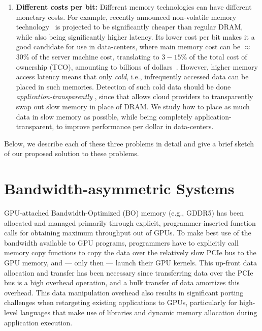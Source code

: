 \begin{enumerate}
\item
\textbf{Different costs per bit:}
Different memory technologies can have different monetary costs.  For example,
recently announced non-volatile memory technology~\cite{xpoint} is projected to
be significantly cheaper than regular DRAM, while also being significantly
higher latency. Its lower cost per bit makes it a good candidate for use in
data-centers, where main memory cost can be $\approx$ 30\% of the server machine
cost, translating to $3-15\%$ of the total cost of ownership (TCO), amounting to
billions of dollars~\cite{borosso2013}. However, higher memory access latency means that only
{\it cold}, i.e., infrequently accessed data can be placed in such memories.
Detection of such cold data should be done {\it
application-transparently} , since
that allows cloud providers to transparently swap out slow memory in place of
DRAM.
We study how to place as much data in slow memory as possible, while being
completely application-transparent, to improve
performance per dollar in data-centers.  \end{enumerate}

Below, we describe each of these three problems in detail and give a brief
sketch of our proposed solution to these problems.

\section{Bandwidth-asymmetric Systems}
GPU-attached Bandwidth-Optimized (BO) memory (e.g., GDDR5) has been allocated
and managed primarily through explicit, programmer-inserted function calls for
obtaining maximum throughput out of GPUs.  To make best use of the bandwidth
available to GPU programs, programmers have to explicitly call memory copy
functions to copy the data over the relatively slow PCIe bus to the GPU memory,
and --- only then --- launch their GPU kernels.  This up-front data allocation
and transfer has been necessary since transferring data over the PCIe bus is a
high overhead operation, and a bulk transfer of data amortizes this overhead.
This data manipulation overhead also results in significant porting challenges
when retargeting existing applications to GPUs, particularly for high-level
languages that make use of libraries and dynamic memory allocation during
application execution.

